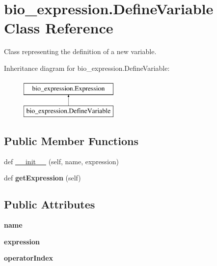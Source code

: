 \hypertarget{classbio__expression_1_1_define_variable}{}\section{bio\+\_\+expression.\+Define\+Variable Class Reference}
\label{classbio__expression_1_1_define_variable}


Class representing the definition of a new variable.  


Inheritance diagram for bio\+\_\+expression.\+Define\+Variable\+:\begin{figure}[H]
\begin{center}
\leavevmode
\includegraphics[height=2.000000cm]{classbio__expression_1_1_define_variable}
\end{center}
\end{figure}
\subsection*{Public Member Functions}
\begin{DoxyCompactItemize}
\item 
def \hyperlink{classbio__expression_1_1_define_variable_a281024ef6dde471eb9164448c7404bf2}{\+\_\+\+\_\+init\+\_\+\+\_\+} (self, name, expression)
\item 
def {\bfseries get\+Expression} (self)\hypertarget{classbio__expression_1_1_define_variable_a0908c7e52d4d847db090eb21c023b492}{}\label{classbio__expression_1_1_define_variable_a0908c7e52d4d847db090eb21c023b492}

\end{DoxyCompactItemize}
\subsection*{Public Attributes}
\begin{DoxyCompactItemize}
\item 
{\bfseries name}\hypertarget{classbio__expression_1_1_define_variable_ad6fbc0e163c5cd0a76e0d86960d831a7}{}\label{classbio__expression_1_1_define_variable_ad6fbc0e163c5cd0a76e0d86960d831a7}

\item 
{\bfseries expression}\hypertarget{classbio__expression_1_1_define_variable_a06ba185542aaef35a3ed57c92b427126}{}\label{classbio__expression_1_1_define_variable_a06ba185542aaef35a3ed57c92b427126}

\item 
{\bfseries operator\+Index}\hypertarget{classbio__expression_1_1_define_variable_a4f43782aed1e3a2fdf23b75480952cd5}{}\label{classbio__expression_1_1_define_variable_a4f43782aed1e3a2fdf23b75480952cd5}

\end{DoxyCompactItemize}


